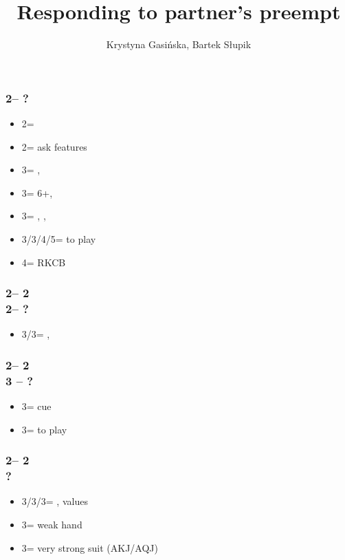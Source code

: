 \documentclass[12pt, a4paper]{article}
\title{Responding to partner's preempt}
\author{Krystyna Gasińska, Bartek Słupik}
\begin{document}
\maketitle


\subsubsection*{2\hearts -- ?}
\begin{itemize}
    \item 2\spades = \lsf
    \item 2\nt = ask \nt features
    \item 3\clubs = \minor, \gf
    \item 3\diams = 6+\spades, \invp \vimp
    \item 3\spades = \spades, \inv, \nf
    \item 3\hearts/3\nt/4\major/5\minor = to play
    \item 4\clubs = RKCB
\end{itemize}

\subsubsection*{2\hearts -- 2\spades\\
                2\nt -- ?}
\begin{itemize}
    \item 3\clubs/3\diams = \nat, \inv
\end{itemize}

\subsubsection*{2\hearts -- 2\spades\\
                3 -- ?}
\begin{itemize}
    \item 3\spades = cue
    \item 3\nt = to play
\end{itemize}

\subsubsection*{2\hearts -- 2\nt\\
                ?}
\begin{itemize}
    \item 3\clubs/3\diams/3\spades = \nat, \nt values
    \item 3\hearts = weak hand
    \item 3\nt = very strong suit (AKJ/AQJ)
\end{itemize}
\end{document}
